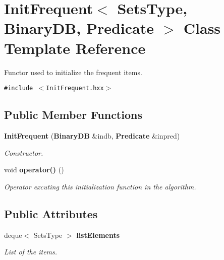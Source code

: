 \section{Init\-Frequent$<$ Sets\-Type, Binary\-DB, Predicate $>$ Class Template Reference}
\label{class_init_frequent}
Functor used to initialize the frequent items.  


{\tt \#include $<$Init\-Frequent.hxx$>$}

\subsection*{Public Member Functions}
\begin{CompactItemize}
\item 
{\bf Init\-Frequent} ({\bf Binary\-DB} \&indb, {\bf Predicate} \&inpred)\label{class_init_frequent_686b379a23f75c8e1df5c8702d462683}

\begin{CompactList}\small\item\em Constructor. \item\end{CompactList}\item 
void {\bf operator()} ()\label{class_init_frequent_8f248a5ae7603efb1b9bc52ff7323bbd}

\begin{CompactList}\small\item\em Operator excuting this initialization function in the algorithm. \item\end{CompactList}\end{CompactItemize}
\subsection*{Public Attributes}
\begin{CompactItemize}
\item 
deque$<$ Sets\-Type $>$ {\bf list\-Elements}\label{class_init_frequent_7bbf538d239ba565980cd201b7b5f08a}

\begin{CompactList}\small\item\em List of the items. \item\end{CompactList}\end{CompactItemize}
